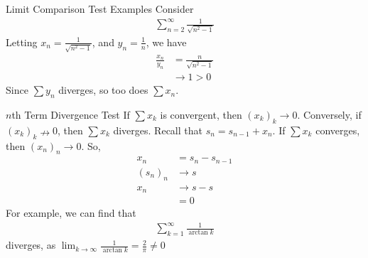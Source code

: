 \documentclass[10pt]{extarticle}
\begin{document}
  \begin{problem}{Limit Comparison Test Examples}
    Consider
    \begin{align*}
      \sum_{n=2}^{\infty}\frac{1}{\sqrt{n^2 -1}}
    \end{align*}
    Letting $x_n = \frac{1}{\sqrt{n^2 - 1}}$, and $y_n = \frac{1}{n}$, we have
    \begin{align*}
      \frac{x_n}{y_n} &= \frac{n}{\sqrt{n^2 - 1}}\\
                      &\rightarrow 1 > 0
    \end{align*}
    Since $\sum y_n$ diverges, so too does $\sum x_n$.
  \end{problem}
  \begin{problem}{$n$th Term Divergence Test}
    If $\sum x_k$ is convergent, then $(x_k)_k \rightarrow 0$. Conversely, if $(x_k)_k \nrightarrow 0$, then $\sum x_k$ diverges.
    Recall that $s_n = s_{n-1} + x_n$. If $\sum x_k$ converges, then $(x_n)_n \rightarrow 0$. So,
    \begin{align*}
      x_n &= s_n - s_{n-1}\\
      (s_n)_n &\rightarrow s\\
      x_n &\rightarrow s - s\\
          &= 0
    \end{align*}
    For example, we can find that
    \begin{align*}
      \sum_{k=1}^{\infty}\frac{1}{\arctan{k}}
    \end{align*}
    diverges, as $\lim_{k\rightarrow\infty}\frac{1}{\arctan{k}} = \frac{2}{\pi} \neq 0$
  \end{problem}
\end{document}
